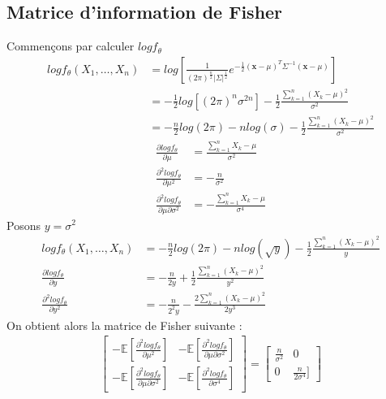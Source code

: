 \documentclass{report}
\begin{document}
		\subsection{Matrice d'information de Fisher}
			Commençons par calculer $log f_\theta$
			\begin{align*}
				log f_\theta(X_1, \ldots, X_n) &= log\left[ \frac{1}{(2\pi)^\frac{n}{2}|\Sigma|^\frac{1}{2}}e^{-\frac{1}{2}(\textbf{x}-\mu)^T\Sigma^{-1}(\textbf{x}-\mu)} \right]\\
				&= -\frac{1}{2}log\left[ (2\pi)^n \sigma^{2n} \right] -\frac{1}{2}\frac{\sum\limits_{k=1}^n (X_k - \mu)^2}{\sigma^2} \\
				&= -\frac{n}{2}log(2\pi)-n log(\sigma) -\frac{1}{2}\frac{\sum\limits_{k=1}^n (X_k - \mu)^2}{\sigma^2}
			\end{align*}
			\begin{align*}
				\frac{\partial log f_\theta}{\partial \mu} &= \frac{\sum\limits_{k=1}^n X_k - \mu}{\sigma^2}\\
				\frac{\partial^2 log f_\theta}{\partial \mu^2} &= -\frac{n}{\sigma^2}\\
				\frac{\partial^2 log f_\theta}{\partial \mu \partial \sigma^2} &= -\frac{\sum\limits_{k=1}^n X_k - \mu}{\sigma^4}
			\end{align*}
			Posons $y=\sigma^2$
			\begin{align*}
				log f_\theta(X_1, \ldots, X_n) &= -\frac{n}{2}log(2\pi)-n log(\sqrt{y}) -\frac{1}{2}\frac{\sum\limits_{k=1}^n (X_k - \mu)^2}{y}\\
				\frac{\partial log f_\theta}{\partial y} &= -\frac{n}{2y} + \frac{1}{2}\frac{\sum\limits_{k=1}^n (X_k - \mu)^2}{y^2}\\
				\frac{\partial^2 log f_\theta}{\partial y^2} &= -\frac{n}{2^2y} - \frac{2\sum\limits_{k=1}^n (X_k - \mu)^2}{2y^3}
			\end{align*}
			On obtient alors la matrice de Fisher suivante :
			\begin{align*}
				\left[\begin{array}{cc}
					-\mathbb{E}[\frac{\partial^2 log f_\theta}{\partial \mu^2}] & -\mathbb{E}[\frac{\partial^2 log f_\theta}{\partial \mu \partial \sigma^2}] \\
					-\mathbb{E}[\frac{\partial^2 log f_\theta}{\partial \mu \partial \sigma^2}] & -\mathbb{E}[\frac{\partial^2 log f_\theta}{\partial \sigma^4}]
				\end{array}\right]
				=
				\left[\begin{array}{cc}
					\frac{n}{\sigma^2} & 0 \\
					0 & \frac{n}{2\sigma^4}]
				\end{array}\right]
			\end{align*}
\end{document}
